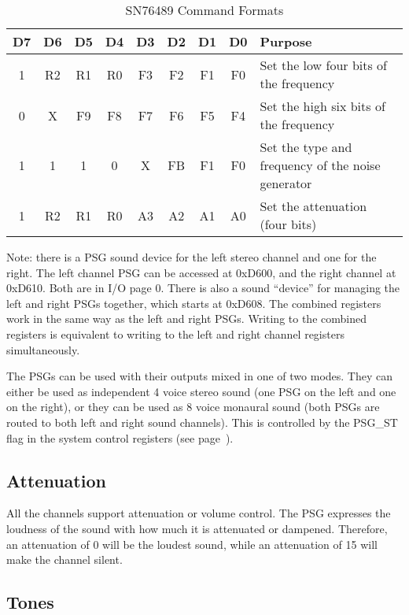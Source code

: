 \begin{table}[ht]
	\begin{center}
		\begin{tabular}{|c|c|c|c|c|c|c|c|l|} \hline
			D7 & D6 & D5 & D4 & D3 & D2 & D1 & D0 & Purpose \\ \hline \hline
			1 & R2 & R1 & R0 & F3 & F2 & F1 & F0 & Set the low four bits of the frequency \\ \hline
			0 & X & F9 & F8 & F7 & F6 & F5 & F4 & Set the high six bits of the frequency \\ \hline
			1 & 1 & 1 & 0 & X & FB & F1 & F0 & Set the type and frequency of the noise generator \\ \hline
			1 & R2 & R1 & R0 & A3 & A2 & A1 & A0 & Set the attenuation (four bits) \\ \hline
		\end{tabular}
	\end{center}
	\caption{SN76489 Command Formats}
	\label{tab:psg_commands}
\end{table}

Note: there is a PSG sound device for the left stereo channel and one for the right. The left channel PSG can be accessed at 0xD600, and the right channel at 0xD610. Both are in I/O page 0. There is also a sound ``device'' for managing the left and right PSGs together, which starts at 0xD608. The combined registers work in the same way as the left and right PSGs. Writing to the combined registers is equivalent to writing to the left and right channel registers simultaneously.

The PSGs can be used with their outputs mixed in one of two modes. They can either be used as independent 4 voice stereo sound (one PSG on the left and one on the right), or they can be used as 8 voice monaural sound (both PSGs are routed to both left and right sound channels). This is controlled by the PSG\_ST flag in the system control registers (see page~\pageref{tab:sys_ctrl_reg}).

\subsection*{Attenuation}

All the channels support attenuation or volume control. The PSG expresses the loudness of the sound with how much it is attenuated or dampened. Therefore, an attenuation of 0 will be the loudest sound, while an attenuation of 15 will make the channel silent.

\subsection*{Tones}

